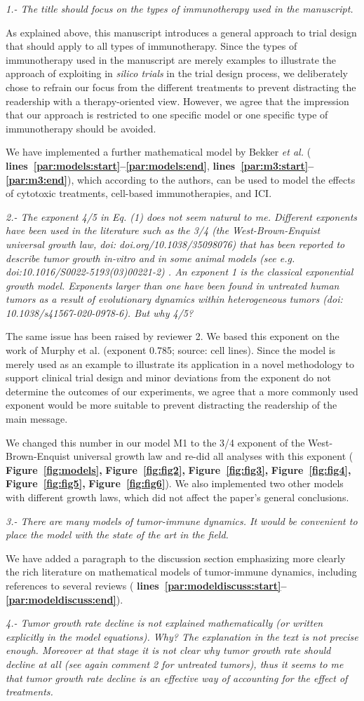 \documentclass{article}
\newcommand{\revr}[1]{{\color{gray} \itshape #1}}
\newcommand{\auth}[1]{{#1}}
\newcommand{\chng}[1]{{\color{blue!70!black} #1}}
\newcommand{\myref}[2]{{\bfseries\color{red!70!black} Figure~\ref{#1}#2}}
\newcommand{\lr}[1]{{\bfseries\color{red!70!black} lines~\ref{#1:start}--\ref{#1:end}}}
\newcommand{\exponent}[1]{\auth{The same issue has been raised by reviewer #1. We based this exponent on the work of Murphy et al. \cite{Murphy2016} (exponent 0.785; source: cell lines). Since the model is merely used as an example to illustrate its application in a novel methodology to support clinical trial design and minor deviations from the exponent do not determine the outcomes of our experiments, we agree that a more commonly used exponent would be more suitable to prevent distracting the readership of the main message.}

\chng{We changed this number in our model M1 to the 3/4 exponent of the West-Brown-Enquist universal growth law \cite{West2001} and re-did all analyses with this exponent (\myref{fig:models}, \myref{fig:fig2}, \myref{fig:fig3}, \myref{fig:fig4}, \myref{fig:fig5}, \myref{fig:fig6}{}). We also implemented two other models with different growth laws, which did not affect the paper's general conclusions.}}
\begin{document}
\revr{1.- The title should focus on the types of immunotherapy used in the manuscript.}

\auth{As explained above, this manuscript introduces a general approach to trial design that should apply to all types of immunotherapy. Since the types of immunotherapy used in the manuscript are merely examples to illustrate the approach of exploiting in \emph{silico trials} in the trial design process, we deliberately chose to refrain our focus from the different treatments to prevent distracting the readership with a therapy-oriented view. However, we agree that the impression that our approach is restricted to one specific model or one specific type of immunotherapy should be avoided.}

\chng{
We have implemented a further mathematical model by Bekker \emph{et al.}\cite{Bekker2022} (\lr{par:models}, \lr{par:m3}), which according to the authors, can be used to model the effects of cytotoxic treatments, cell-based immunotherapies, and ICI. 
}

\revr{2.- The exponent 4/5 in Eq. (1) does not seem natural to me. Different exponents have been used in the literature such as the 3/4 (the West-Brown-Enquist universal growth law, doi: doi.org/10.1038/35098076) that has been reported to describe tumor growth in-vitro and in some animal models (see e.g. doi:10.1016/S0022-5193(03)00221-2) . An exponent 1 is the classical exponential growth model. Exponents larger than one have been found in untreated human tumors as a result of evolutionary dynamics within heterogeneous tumors (doi: 10.1038/s41567-020-0978-6). But why 4/5?}

\exponent{2}



\revr{3.- There are many models of tumor-immune dynamics. It would be convenient to place the model with the state of the art in the field.}

\chng{We have added a paragraph to the discussion section emphasizing more clearly the rich literature on mathematical models of tumor-immune dynamics, including references to several reviews (\lr{par:modeldiscuss}).}

\revr{4.- Tumor growth rate decline is not explained mathematically (or written explicitly in the model equations). Why? The explanation in the text is not precise enough. Moreover at that stage it is not clear why tumor growth rate should decline at all (see again comment 2 for untreated tumors), thus it seems to me that tumor growth rate decline is an effective way of accounting for the effect of treatments.}
\end{document}
